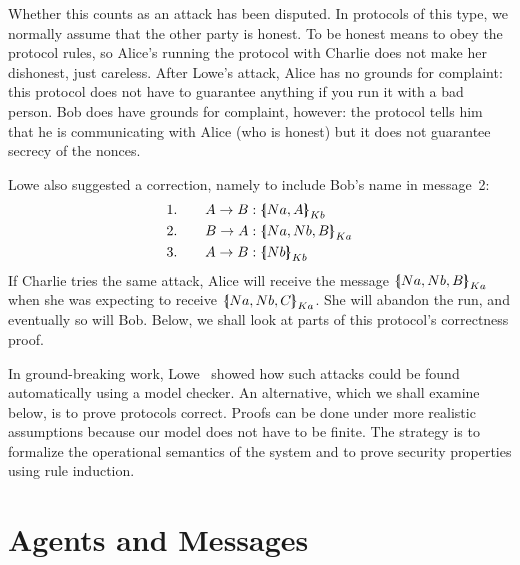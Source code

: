 Whether this counts as an attack has been disputed.  In protocols of this
type, we normally assume that the other party is honest.  To be honest
means to obey the protocol rules, so Alice's running the protocol with
Charlie does not make her dishonest, just careless.  After Lowe's
attack, Alice has no grounds for complaint: this protocol does not have to
guarantee anything if you run it with a bad person.  Bob does have
grounds for complaint, however: the protocol tells him that he is
communicating with Alice (who is honest) but it does not guarantee
secrecy of the nonces.

Lowe also suggested a correction, namely to include Bob's name in
message~2:
\begin{alignat*}{2}
  &1.&\quad  A\to B  &: \mathopen{\{\kern-.30em|} Na,A\mathclose{|\kern-.32em\}}\sb{Kb} \\
  &2.&\quad  B\to A  &: \mathopen{\{\kern-.30em|} Na,Nb,B\mathclose{|\kern-.32em\}}\sb{Ka} \\
  &3.&\quad  A\to B  &: \mathopen{\{\kern-.30em|} Nb\mathclose{|\kern-.32em\}}\sb{Kb}
\end{alignat*}
If Charlie tries the same attack, Alice will receive the message
$\mathopen{\{\kern-.30em|} Na,Nb,B\mathclose{|\kern-.32em\}}\sb{Ka}$ when she was expecting to receive
$\mathopen{\{\kern-.30em|} Na,Nb,C\mathclose{|\kern-.32em\}}\sb{Ka}$.  She will abandon the run, and eventually so
will Bob.  Below, we shall look at parts of this protocol's correctness
proof. 

In ground-breaking work, Lowe~\cite{lowe-fdr}
showed how such attacks
could be found automatically using a model checker.  An alternative,
which we shall examine below, is to prove protocols correct.  Proofs
can be done under more realistic assumptions because our model does
not have to be finite.  The strategy is to formalize the operational
semantics of the system and to prove security properties using rule
induction.%


\section{Agents and Messages}

